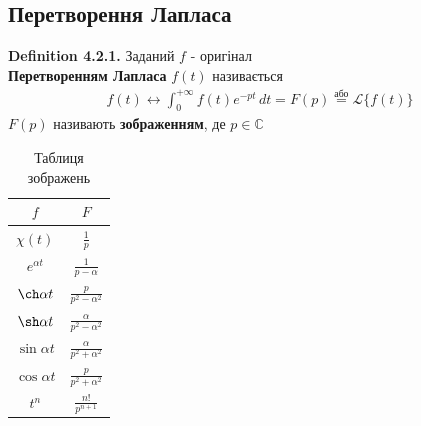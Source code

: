 \documentclass{math_library}
\begin{document}
\subsection{Перетворення Лапласа}
\textbf{Definition 4.2.1.} Заданий $f$ - оригінал\\
\textbf{Перетворенням Лапласа} $f(t)$ називається
\begin{align*}
f(t) \leftrightarrow \int_0^{+\infty} f(t)e^{-pt}\,dt = F(p) \overset{\textrm{або}}{=} \mathscr{L}\{f(t)\}
\end{align*}
$F(p)$ називають \textbf{зображенням}, де $p \in \mathbb{C}$
\bigskip \\
\begin{table}[h!]
\begin{center}
\begin{tabular}{ c|c }
 $f$ & $F$ \\
 \hline
 $\chi(t)$ & $\displaystyle \frac{1}{p}$ \\
 \hline
 $e^{\alpha t}$ & $\displaystyle \frac{1}{p- \alpha}$\\
 \hline
 $\ch \alpha t$ & $\displaystyle \frac{p}{p^2-\alpha^2}$\\
 \hline
 $\sh \alpha t$ & $\displaystyle \frac{\alpha}{p^2-\alpha^2}$\\
 \hline
 $\sin \alpha t$ & $\displaystyle \frac{\alpha}{p^2 + \alpha^2}$\\
 \hline
 $\cos \alpha t$ & $\displaystyle \frac{p}{p^2 + \alpha^2}$\\
 \hline
 $t^n$ & $\displaystyle \frac{n!}{p^{n+1}}$ \\
\end{tabular}
	    \caption{Таблиця зображень}
    		\label{tab:table1}
\end{center}
\end{table}
\end{document}

